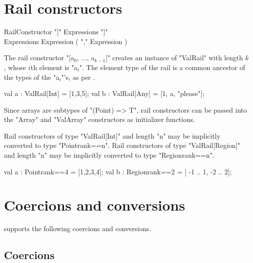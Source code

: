\section{Rail constructors}
\label{RailConstructors}

\begin{grammar}
RailConstructor \: \xcd"[" Expressions \xcd"]" \\
Expressions \: Expression ( \xcd"," Expression )\star \\
\end{grammar}

The rail constructor \xcdmath"[a$_0$, $\dots$, a$_{k-1}$]"
creates an instance of \xcd"ValRail" with length $k$, 
whose $i$th element is
\xcdmath"a$_i$".  The element type of the rail is a common ancestor of the
types of the \xcdmath"a$_i$"'s, as per .
\begin{xten}
val a : ValRail[Int] = [1,3,5];
val b : ValRail[Any] = [1, a, "please"];
\end{xten}

Since arrays are subtypes of \xcd"(Point) => T",
rail constructors can be passed into the \xcd"Array" and
\xcd"ValArray" constructors as initializer functions.

Rail constructors of type \xcd"ValRail[Int]" and length \xcd"n" 
may be implicitly converted to type \xcd"Point{rank==n}".
Rail constructors of type \xcd"ValRail[Region]" and length \xcd"n" 
may be implicitly converted to type \xcd"Region{rank==n}".

\begin{xten}
val a : Point{rank==4} = [1,2,3,4];
val b : Region{rank==2} = [ -1 .. 1, -2 .. 2];
\end{xten}


\section{Coercions and conversions}
\label{XtenConversions}
\label{User-definedCoercions}

\XtenCurrVer{} supports the following coercions and conversions.

\subsection{Coercions}

